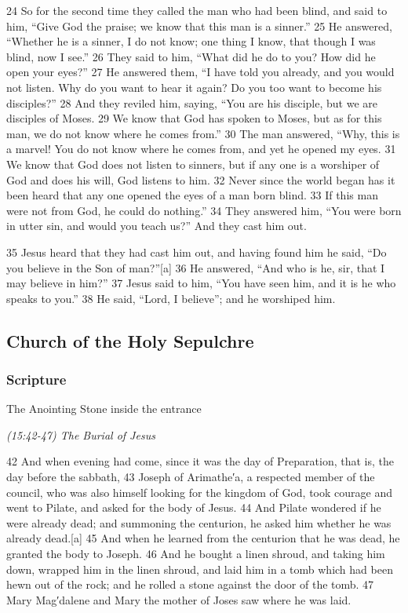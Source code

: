 \documentclass[letterpaper]{report}
\begin{document}
\begin{multicols}{2}
24 So for the second time they called the man who had been blind, and said to him, “Give God the praise; we know that this man is a sinner.” 25 He answered, “Whether he is a sinner, I do not know; one thing I know, that though I was blind, now I see.” 26 They said to him, “What did he do to you? How did he open your eyes?” 27 He answered them, “I have told you already, and you would not listen. Why do you want to hear it again? Do you too want to become his disciples?” 28 And they reviled him, saying, “You are his disciple, but we are disciples of Moses. 29 We know that God has spoken to Moses, but as for this man, we do not know where he comes from.” 30 The man answered, “Why, this is a marvel! You do not know where he comes from, and yet he opened my eyes. 31 We know that God does not listen to sinners, but if any one is a worshiper of God and does his will, God listens to him. 32 Never since the world began has it been heard that any one opened the eyes of a man born blind. 33 If this man were not from God, he could do nothing.” 34 They answered him, “You were born in utter sin, and would you teach us?” And they cast him out.

35 Jesus heard that they had cast him out, and having found him he said, “Do you believe in the Son of man?”[a] 36 He answered, “And who is he, sir, that I may believe in him?” 37 Jesus said to him, “You have seen him, and it is he who speaks to you.” 38 He said, “Lord, I believe”; and he worshiped him.
\end{multicols}

\clearpage
\subsection{Church of the Holy Sepulchre}
\begin{multicols}{2}
	\mbox{}
\end{multicols}
\subsubsection{Scripture}
{\centering
	The Anointing Stone inside the entrance
	
	\emph{(15:42-47) The Burial of Jesus}\\
}
\begin{multicols}{2}
	42 And when evening had come, since it was the day of Preparation, that is, the day before the sabbath, 43 Joseph of Arimathe′a, a respected member of the council, who was also himself looking for the kingdom of God, took courage and went to Pilate, and asked for the body of Jesus. 44 And Pilate wondered if he were already dead; and summoning the centurion, he asked him whether he was already dead.[a] 45 And when he learned from the centurion that he was dead, he granted the body to Joseph. 46 And he bought a linen shroud, and taking him down, wrapped him in the linen shroud, and laid him in a tomb which had been hewn out of the rock; and he rolled a stone against the door of the tomb. 47 Mary Mag′dalene and Mary the mother of Joses saw where he was laid.
\end{multicols}
\end{document}

